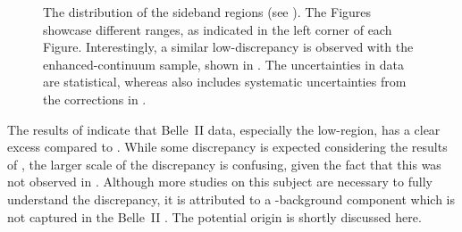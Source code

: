 \begin{figure}[hbtp!]
    \centering
    \caption{\label{fig:sidebands_mbc} 
    The \Mbc distribution of the \EB sideband regions (see ).
    The Figures showcase different \EB ranges, as indicated in the left corner of each Figure.
    Interestingly, a similar low-\Mbc discrepancy is observed with the enhanced-continuum sample, shown in .
    The uncertainties in data are statistical, whereas \MC also includes systematic uncertainties from the corrections in .
    }
\end{figure}

The results of  indicate that Belle~II data, especially the low-\Mbc region, has a clear excess compared to \MC.
While some discrepancy is expected considering the results of ,
the larger scale of the discrepancy is confusing, given the fact that this was not observed in .
Although more studies on this subject are necessary to fully understand the discrepancy, 
it is attributed to a \BB-background component which is not captured in the Belle~II \MC. 
The potential origin is shortly discussed here.

